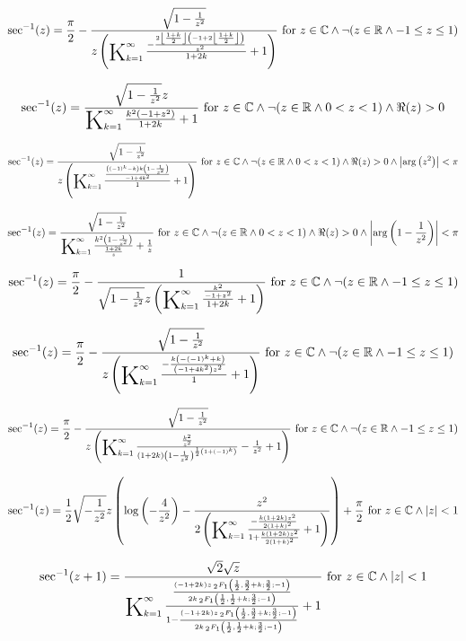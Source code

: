 \documentclass{article}
\newcommand{\bigK}{\mathop{\raisebox{-5pt}{\huge K}}}
\begin{document}
\[\sec ^{-1}(z)=\frac{\pi }{2}-\frac{\sqrt{1-\frac{1}{z^2}}}{z \left(\bigK_{k=1}^{\infty}\frac{-\frac{2 \left\lfloor \frac{1+k}{2}\right\rfloor  \left(-1+2 \left\lfloor \frac{1+k}{2}\right\rfloor \right)}{z^2}}{1+2 k}+1\right)}\text{ for }z\in \mathbb{C}\land \neg (z\in \mathbb{R}\land -1\leq z\leq 1)\] 

\[\sec ^{-1}(z)=\frac{\sqrt{1-\frac{1}{z^2}} z}{\bigK_{k=1}^{\infty}\frac{k^2 \left(-1+z^2\right)}{1+2 k}+1}\text{ for }z\in \mathbb{C}\land \neg (z\in \mathbb{R}\land 0<z<1)\land \Re(z)>0\] 

\[\sec ^{-1}(z)=\frac{\sqrt{1-\frac{1}{z^2}}}{z \left(\bigK_{k=1}^{\infty}\frac{\frac{\left((-1)^k-k\right) k \left(1-\frac{1}{z^2}\right)}{-1+4 k^2}}{1}+1\right)}\text{ for }z\in \mathbb{C}\land \neg (z\in \mathbb{R}\land 0<z<1)\land \Re(z)>0\land \left| \arg \left(z^2\right)\right| <\pi\] 

\[\sec ^{-1}(z)=\frac{\sqrt{1-\frac{1}{z^2}}}{\bigK_{k=1}^{\infty}\frac{k^2 \left(1-\frac{1}{z^2}\right)}{\frac{1+2 k}{z}}+\frac{1}{z}}\text{ for }z\in \mathbb{C}\land \neg (z\in \mathbb{R}\land 0<z<1)\land \Re(z)>0\land \left| \arg \left(1-\frac{1}{z^2}\right)\right| <\pi\] 

\[\sec ^{-1}(z)=\frac{\pi }{2}-\frac{1}{\sqrt{1-\frac{1}{z^2}} z \left(\bigK_{k=1}^{\infty}\frac{\frac{k^2}{-1+z^2}}{1+2 k}+1\right)}\text{ for }z\in \mathbb{C}\land \neg (z\in \mathbb{R}\land -1\leq z\leq 1)\] 

\[\sec ^{-1}(z)=\frac{\pi }{2}-\frac{\sqrt{1-\frac{1}{z^2}}}{z \left(\bigK_{k=1}^{\infty}\frac{-\frac{k \left(-(-1)^k+k\right)}{\left(-1+4 k^2\right) z^2}}{1}+1\right)}\text{ for }z\in \mathbb{C}\land \neg (z\in \mathbb{R}\land -1\leq z\leq 1)\] 

\[\sec ^{-1}(z)=\frac{\pi }{2}-\frac{\sqrt{1-\frac{1}{z^2}}}{z \left(\bigK_{k=1}^{\infty}\frac{\frac{k^2}{z^2}}{(1+2 k) \left(1-\frac{1}{z^2}\right)^{\frac{1}{2} \left(1+(-1)^k\right)}}-\frac{1}{z^2}+1\right)}\text{ for }z\in \mathbb{C}\land \neg (z\in \mathbb{R}\land -1\leq z\leq 1)\] 

\[\sec ^{-1}(z)=\frac{1}{2} \sqrt{-\frac{1}{z^2}} z \left(\log \left(-\frac{4}{z^2}\right)-\frac{z^2}{2 \left(\bigK_{k=1}^{\infty}\frac{-\frac{k (1+2 k) z^2}{2 (1+k)^2}}{1+\frac{k (1+2 k) z^2}{2 (1+k)^2}}+1\right)}\right)+\frac{\pi }{2}\text{ for }z\in \mathbb{C}\land \left| z\right| <1\] 

\[\sec ^{-1}(z+1)=\frac{\sqrt{2} \sqrt{z}}{\bigK_{k=1}^{\infty}\frac{\frac{(-1+2 k) z \, _2F_1\left(\frac{1}{2},\frac{3}{2}+k;\frac{3}{2};-1\right)}{2 k \, _2F_1\left(\frac{1}{2},\frac{1}{2}+k;\frac{3}{2};-1\right)}}{1-\frac{(-1+2 k) z \, _2F_1\left(\frac{1}{2},\frac{3}{2}+k;\frac{3}{2};-1\right)}{2 k \, _2F_1\left(\frac{1}{2},\frac{1}{2}+k;\frac{3}{2};-1\right)}}+1}\text{ for }z\in \mathbb{C}\land \left| z\right| <1\] 
\end{document}
